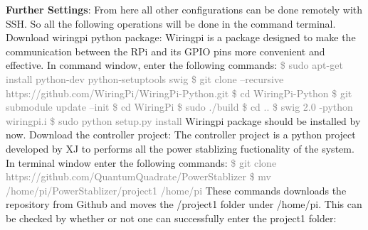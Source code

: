 \documentclass{article}
\begin{document}
\textbf{Further Settings}: From here all other configurations can be done remotely with SSH. So all the following operations will be done in the command terminal.\newline\newline
Download wiringpi python package:\newline
Wiringpi is a package designed to make the communication between the RPi and its GPIO pins more convenient and effective. In command window, enter the following commands:\newline
\textcolor{gray}{\$ sudo apt-get install python-dev python-setuptools swig}\newline
\textcolor{gray}{\$ git clone –recursive https://github.com/WiringPi/WiringPi-Python.git}\newline
\textcolor{gray}{\$ cd WiringPi-Python}\newline
\textcolor{gray}{\$ git submodule update –init}\newline
\textcolor{gray}{\$ cd WiringPi}\newline
\textcolor{gray}{\$ sudo ./build}\newline
\textcolor{gray}{\$ cd ..}\newline
\textcolor{gray}{\$ swig 2.0 -python wiringpi.i}\newline
\textcolor{gray}{\$ sudo python setup.py install}\newline
Wiringpi package should be installed by now.\newline\newline
Download the controller project:\newline
The controller project is  a python project developed by XJ to performs all the power stablizing fuctionality of the system. \newline
In terminal window enter the following commands:\newline
\textcolor{gray}{\$ git clone https://github.com/QuantumQuadrate/PowerStablizer}\newline
\textcolor{gray}{\$ mv /home/pi/PowerStablizer/project1 /home/pi}\newline
These commands downloads the repository from Github and moves the /project1 folder under /home/pi. This can be checked by whether or not one can successfully enter the project1 folder:\newline
\end{document}
